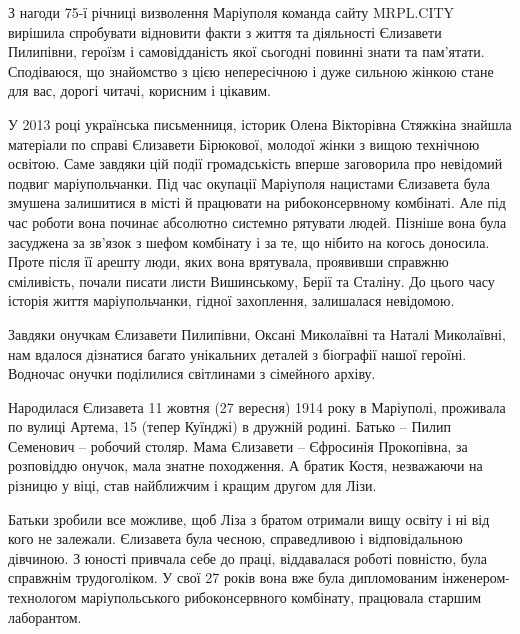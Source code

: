 З нагоди 75-ї річниці визволення Маріуполя команда сайту MRPL.CITY вирішила
спробувати відновити факти з життя та діяльності Єлизавети Пилипівни, героїзм і
самовідданість якої сьогодні повинні знати та пам'ятати. Сподіваюся, що
знайомство з цією непересічною і дуже сильною жінкою стане для вас, дорогі
читачі, корисним і цікавим.


У 2013 році українська письменниця, історик Олена Вікторівна Стяжкіна знайшла
матеріали по справі Єлизавети Бірюкової, молодої жінки з вищою технічною
освітою. Саме завдяки цій події громадськість вперше заговорила про невідомий
подвиг маріупольчанки. Під час окупації Маріуполя нацистами Єлизавета була
змушена залишитися в місті й працювати на рибоконсервному комбінаті. Але під
час роботи вона починає абсолютно системно рятувати людей. Пізніше вона була
засуджена за зв'язок з шефом комбінату і за те, що нібито на когось доносила.
Проте після її арешту люди, яких вона врятувала, проявивши справжню сміливість,
почали писати листи Вишинському, Берії та Сталіну. До цього часу історія життя
маріупольчанки, гідної захоплення, залишалася невідомою.


Завдяки онучкам Єлизавети Пилипівни, Оксані Миколаївні та Наталі Миколаївні,
нам вдалося дізнатися багато унікальних деталей з біографії нашої героїні.
Водночас онучки поділилися світлинами з сімейного архіву.

Народилася Єлизавета 11 жовтня (27 вересня) 1914 року в Маріуполі, проживала по
вулиці Артема, 15 (тепер Куїнджі) в дружній родині. Батько – Пилип Семенович –
робочий столяр. Мама Єлизавети – Єфросинія Прокопівна, за розповіддю онучок,
мала знатне походження. А братик Костя, незважаючи на різницю у віці, став
найближчим і кращим другом для Лізи.


Батьки зробили все можливе, щоб Ліза з братом отримали вищу освіту і ні від
кого не залежали. Єлизавета була чесною, справедливою і відповідальною
дівчиною. З юності привчала себе до праці, віддавалася роботі повністю, була
справжнім трудоголіком. У свої 27 років вона вже була дипломованим
інженером-технологом маріупольського рибоконсервного комбінату, працювала
старшим лаборантом.

